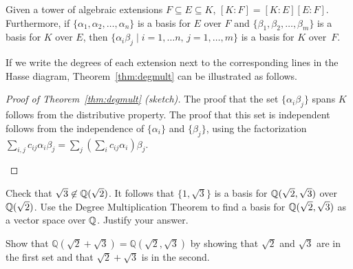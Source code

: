\begin{theorem}\label{thm:degmult}
    Given a tower of algebraic extensions $F \subseteq E \subseteq K$, $[K:F]=[K:E][E:F]$. Furthermore, if $\{\alpha_1,\alpha_2,\ldots,\alpha_n\}$ is a basis for $E$ over $F$ and $\{\beta_1,\beta_2,\ldots,\beta_m\}$ is a basis for $K$ over $E$, then $\{\alpha_i\beta_j \mid i=1,\ldots n,\, j=1,\ldots,m \}$ is a basis for $K$ over~$F$.
\end{theorem}

If we write the degrees of each extension next to the corresponding lines in the Hasse diagram, Theorem~\ref{thm:degmult} can be illustrated as follows.
\begin{center}\small
{}
\end{center}

\begin{proof}[Proof of Theorem~\ref{thm:degmult} (sketch)]
The proof that the set $\{\alpha_i\beta_j\}$ spans $K$ follows from the distributive property. The proof that this set is independent follows from the independence of $\{\alpha_i\}$ and $\{\beta_j\}$, using the factorization $\sum_{i,j} c_{ij}\alpha_i\beta_j = \sum_j \left( \sum_i c_{ij} \alpha_i \right) \beta_j$.
\begin{annotation}
\end{annotation}
\end{proof}

\begin{problem}
     Check that $\sqrt{3}\not\in \mathbb{Q}(\sqrt{2})$. It follows that $\{1, \sqrt{3}\}$ is a basis for $\mathbb{Q}(\sqrt{2}, \sqrt{3})$ over $\mathbb{Q}(\sqrt{2})$. Use the Degree Multiplication Theorem to find a basis for $\mathbb{Q}(\sqrt{2},\sqrt{3})$ as a vector space over $\mathbb{Q}$. Justify your answer.
\end{problem}

\begin{problem}\label{prob:root2root3}
Show that $\mathbb{Q}\left(\sqrt{2}+\sqrt{3}\right) = \mathbb{Q}\left(\sqrt{2}, \sqrt{3}\right)$ by showing that $\sqrt{2}$ and $\sqrt{3}$ are in the first set and that $\sqrt{2}+\sqrt{3}$ is in the second.
\begin{annotation}
\end{annotation}
\end{problem}

